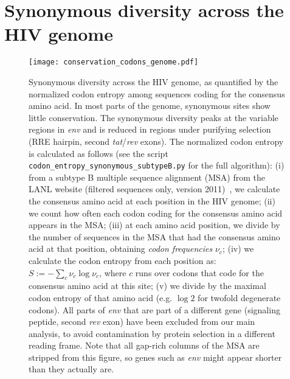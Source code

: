 \section{Synonymous diversity across the HIV genome}
\begin{figure}[!ht]
\begin{center}
\texttt{[image: conservation\_codons\_genome.pdf]}
\caption{
Synonymous diversity across the HIV genome, as quantified by the normalized
codon entropy among sequences coding for the consensus amino acid. In most
parts of the genome, synonymous sites show little conservation. The synonymous
diversity peaks at the variable regions in {\it env} and is reduced in regions 
under purifying selection (RRE hairpin, second {\it tat}/{\it rev} exons). The
normalized codon entropy is calculated as follows (see the script
\texttt{codon\_entropy\_synonymous\_subtypeB.py} for the full algorithm): (i)
from a subtype B multiple sequence alignment (MSA) from the LANL website (filtered sequences only, version 2011)~\cite{LANL2012}, we calculate the
consensus amino acid at each position in the HIV genome; (ii) we count how often
each codon coding for the consensus amino acid appears in the MSA; (iii) at each
amino acid position, we divide by the number of sequences in the MSA that had
the consensus amino acid at that position, obtaining {\it codon frequencies}
$\nu_c$; (iv) we calculate the codon entropy from each position as: $S := -
\sum_{c} \nu_c \log \nu_c$, where $c$ runs over codons that code for the
consensus amino acid at this site; (v) we divide by the maximal codon entropy of
that amino acid (e.g. $\log 2$ for twofold degenerate codons). All parts of
{\it env} that are part of a different gene (signaling peptide, second {\it rev}
exon) have been excluded from our main analysis, to avoid contamination by
protein selection in a different reading frame.
Note that all gap-rich columns of the MSA are stripped from this figure, so genes such as {\it env} might appear shorter than they actually
are.
}
\label{fig:syndiv_genome}
\end{center}
\end{figure}
\newpage

